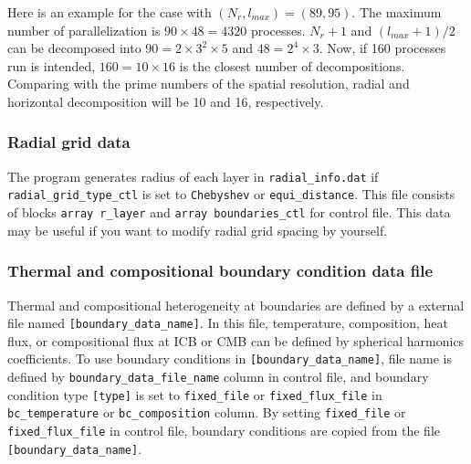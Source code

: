 % 
Here is an example for the case with $(N_{r}, l_{max}) = (89, 95)$. The maximum number of parallelization is $90 \times 48  = 4320$ processes.  $N_{r}+1$ and $\left( l_{max} + 1 \right)  /2$ can be decomposed into $90 = 2 \times 3^2 \times 5$ and $48 = 2^4 \times 3 $. Now, if 160 processes run is intended, $160 = 10 \times 16$ is the closest number of decompositions. Comparing with the prime numbers of the spatial resolution, radial and horizontal decomposition will be 10 and 16, respectively.

\subsubsection{Radial grid data}
The program generates radius of each layer in \verb|radial_info.dat| if \verb|radial_grid_type_ctl| is set to \verb|Chebyshev| or \verb|equi_distance|. This file consists of blocks \verb|array r_layer| and \verb|array boundaries_ctl| for control file. This data may be useful if you want to modify radial grid spacing by yourself.

\subsubsection{Thermal and compositional boundary condition data file}\label{sec:boundary_file}
Thermal and compositional heterogeneity at boundaries are defined by a external file named  \verb|[boundary_data_name]|. In this file, temperature, composition, heat flux, or compositional flux at ICB or CMB can be defined by spherical harmonics coefficients. To use boundary conditions in \verb|[boundary_data_name]|, file name is defined by \verb|boundary_data_file_name| column in control file, and boundary condition type \verb|[type]| is set to \verb|fixed_file| or \verb|fixed_flux_file| in \verb|bc_temperature| or \verb|bc_composition| column. By setting \verb|fixed_file| or \verb|fixed_flux_file| in control file, boundary conditions are copied from the file \verb|[boundary_data_name]|.

